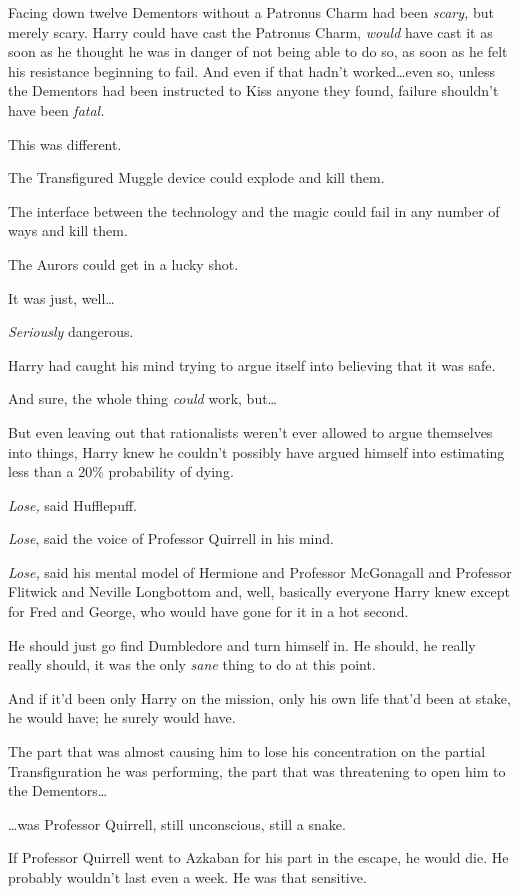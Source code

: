 Facing down twelve Dementors without a Patronus Charm had been \emph{scary,} but merely scary. Harry could have cast the Patronus Charm, \emph{would} have cast it as soon as he thought he was in danger of not being able to do so, as soon as he felt his resistance beginning to fail. And even if that hadn’t worked…even so, unless the Dementors had been instructed to Kiss anyone they found, failure shouldn’t have been \emph{fatal.}

This was different.

The Transfigured Muggle device could explode and kill them.

The interface between the technology and the magic could fail in any number of ways and kill them.

The Aurors could get in a lucky shot.

It was just, well…

\emph{Seriously} dangerous.

Harry had caught his mind trying to argue itself into believing that it was safe.

And sure, the whole thing \emph{could} work, but…

But even leaving out that rationalists weren’t ever allowed to argue themselves into things, Harry knew he couldn’t possibly have argued himself into estimating less than a 20\% probability of dying.

\emph{Lose,} said Hufflepuff.

\emph{Lose}, said the voice of Professor Quirrell in his mind.

\emph{Lose,} said his mental model of Hermione and Professor McGonagall and Professor Flitwick and Neville Longbottom and, well, basically everyone Harry knew except for Fred and George, who would have gone for it in a hot second.

He should just go find Dumbledore and turn himself in. He should, he really really should, it was the only \emph{sane} thing to do at this point.

And if it’d been only Harry on the mission, only his own life that’d been at stake, he would have; he surely would have.

The part that was almost causing him to lose his concentration on the partial Transfiguration he was performing, the part that was threatening to open him to the Dementors…

…was Professor Quirrell, still unconscious, still a snake.

If Professor Quirrell went to Azkaban for his part in the escape, he would die. He probably wouldn’t last even a week. He was that sensitive.

